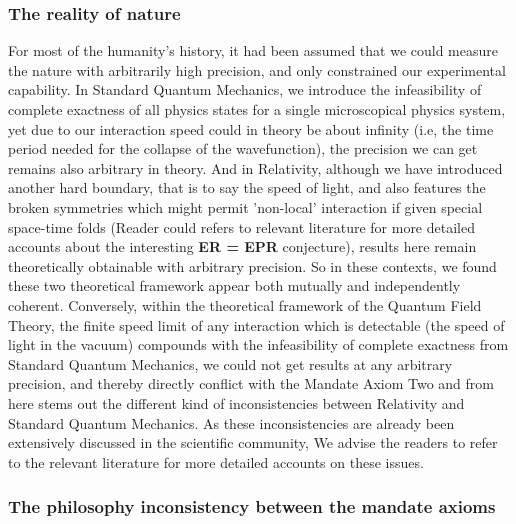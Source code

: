 \documentclass{article}
\begin{document}
\subsubsection{The reality of nature}

For most of the humanity's history, it had been assumed that we could measure the nature with arbitrarily high precision, and only constrained our experimental capability. In Standard Quantum Mechanics, we introduce the infeasibility of complete exactness of all physics states for a single microscopical physics system, yet due to our interaction speed could in theory be about infinity (i.e, the time period needed for the collapse of the wavefunction), the precision we can get remains also arbitrary in theory. \cite{LandauLifshitzV3_2008} And in Relativity, although we have introduced another hard boundary, that is to say the speed of light, and also features the broken symmetries which might permit 'non-local' interaction if given special space-time folds (Reader could refers to relevant literature for more detailed accounts about the interesting \textbf{ER = EPR} conjecture), results here remain theoretically obtainable with arbitrary precision. \cite{LandauLifshitzV2_2012} So in these contexts, we found these two theoretical framework appear both mutually and independently coherent. Conversely, within the theoretical framework of the Quantum Field Theory, the finite speed limit of any interaction which is detectable (the speed of light in the vacuum) compounds with the infeasibility of complete exactness from Standard Quantum Mechanics, we could not get results at any arbitrary precision, and thereby directly conflict with the Mandate Axiom Two and from here stems out the different kind of inconsistencies between Relativity and Standard Quantum Mechanics. \cite{BerestetskiiLifshitzV4_2015} As these inconsistencies are already been extensively discussed in the scientific community, \cite{Weinberg1979} We advise the readers to refer to the relevant literature for more detailed accounts on these issues. \cite{Weinberg2014b}

\subsubsection{The philosophy inconsistency between the mandate axioms}
\end{document}
